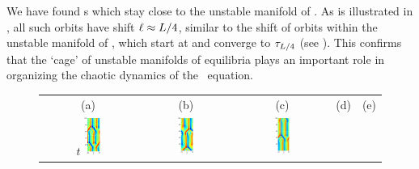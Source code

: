 We have found %
\rpo s which stay
close to the unstable manifold of .
As is illustrated in , all such orbits have
shift $\ell \approx L/4$, similar to the shift of orbits within
the unstable manifold of , which start at  and
converge to $\tau_{L/4}$ (see ). This
confirms that the `cage' of unstable manifolds of equilibria plays
an important role in organizing the chaotic dynamics of the \KS\
equation.

\begin{figure}[t]
\begin{center}
\begin{tabular}{ccccc} (a) & (b) & (c) & (d) & (e)\\
$t$
\includegraphics[width=0.18\textwidth]{figs/ks22rpo047.6-05.68.eps}\hspace{-3ex} &
\includegraphics[width=0.18\textwidth]{figs/ks22rpo055.6-05.25.eps}\hspace{-3ex} &
\includegraphics[width=0.18\textwidth]{figs/ks22rpo059.9-05.44.eps}\hspace{-3ex} &

\end{tabular}
\end{center}
\end{figure}
